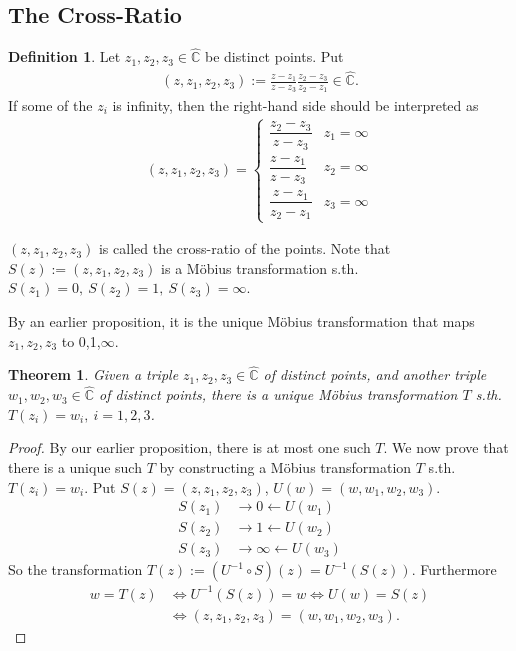 \documentclass[12pt, a4paper]{article}
\theoremstyle{plain}
\newtheorem{thm}{Theorem} %
\theoremstyle{definition}
\newtheorem{definition}{Definition} %
\begin{document}
		\subsection{The Cross-Ratio} %
		\label{sub:the_cross_ratio}
			\begin{definition}
				Let $z_1,z_2,z_3\in\hat{\mathbb{C}}$ be distinct points. Put 
				\begin{align*}
					(z,z_1,z_2,z_3):= \frac{z-z_1}{z-z_3}\frac{z_2-z_3}{z_2-z_1}\in\hat{\mathbb{C}}.
				\end{align*}
				If some of the $z_i$ is infinity, then the right-hand side should be interpreted as
				\begin{align*}
					(z,z_1,z_2,z_3) = 
					\begin{cases}
						\dfrac{z_2-z_3}{z-z_3} &z_1=\infty\\[0.3cm]
						\dfrac{z-z_1}{z-z_3} &z_2=\infty\\[0.3cm]
						\dfrac{z-z_1}{z_2-z_1} &z_3=\infty
					\end{cases}
				\end{align*}
			\end{definition}
			$(z,z_1,z_2,z_3)$ is called the cross-ratio of the points. Note that $S(z):=(z,z_1,z_2,z_3)$ is a Möbius transformation s.th. $S(z_1) =0,\:S(z_2) = 1,\:S(z_3)=\infty$.

			By an earlier proposition, it is the unique Möbius transformation that maps $z_1,z_2,z_3$ to 0,1,$\infty$.\\

			\begin{thm}
				Given a triple $z_1,z_2,z_3\in\hat{\mathbb{C}}$ of distinct points, and another triple $w_1,w_2,w_3\in\hat{\mathbb{C}}$ of distinct points, there is a unique Möbius transformation $T$ s.th. $T(z_i) = w_i,\:i=1,2,3$.
			\end{thm}

			\begin{proof}
				By our earlier proposition, there is at most one such $T$. We now prove that there is a unique such $T$ by constructing a Möbius transformation $T$ s.th. $T(z_i) = w_i$. Put $S(z) = (z,z_1,z_2,z_3)$, $U(w) = (w,w_1,w_2,w_3)$.
				\begin{align*}
					S(z_1) &\longrightarrow 0 \longleftarrow U(w_1)\\
					S(z_2) &\longrightarrow 1 \longleftarrow U(w_2)\\
					S(z_3) &\longrightarrow \infty \longleftarrow U(w_3)
				\end{align*}
				So the transformation $T(z):=(U^{-1}\circ S)(z) = U^{-1}(S(z))$. Furthermore
				\begin{align*}
					w=T(z) &\iff U^{-1}(S(z)) = w \iff U(w) = S(z) \\ &\iff
					(z,z_1,z_2,z_3) = (w,w_1,w_2,w_3).
				\end{align*}
			\end{proof}
\end{document}
